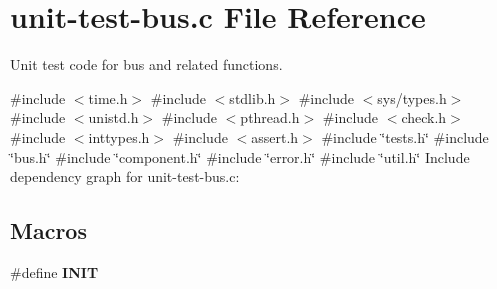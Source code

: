 \hypertarget{unit-test-bus_8c}{}\section{unit-\/test-\/bus.c File Reference}
\label{unit-test-bus_8c}


Unit test code for bus and related functions.  


{\ttfamily \#include $<$time.\+h$>$}\newline
{\ttfamily \#include $<$stdlib.\+h$>$}\newline
{\ttfamily \#include $<$sys/types.\+h$>$}\newline
{\ttfamily \#include $<$unistd.\+h$>$}\newline
{\ttfamily \#include $<$pthread.\+h$>$}\newline
{\ttfamily \#include $<$check.\+h$>$}\newline
{\ttfamily \#include $<$inttypes.\+h$>$}\newline
{\ttfamily \#include $<$assert.\+h$>$}\newline
{\ttfamily \#include \char`\"{}tests.\+h\char`\"{}}\newline
{\ttfamily \#include \char`\"{}bus.\+h\char`\"{}}\newline
{\ttfamily \#include \char`\"{}component.\+h\char`\"{}}\newline
{\ttfamily \#include \char`\"{}error.\+h\char`\"{}}\newline
{\ttfamily \#include \char`\"{}util.\+h\char`\"{}}\newline
Include dependency graph for unit-\/test-\/bus.c\+:
\subsection*{Macros}
\begin{DoxyCompactItemize}
\item 
\#define {\bfseries I\+N\+IT}
\end{DoxyCompactItemize}

